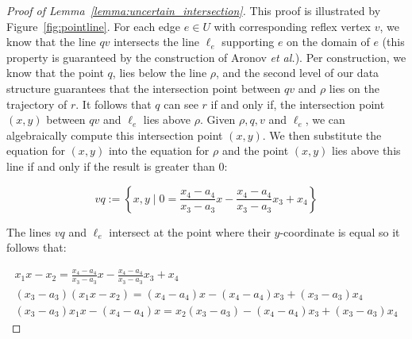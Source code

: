 \documentclass[a4paper, UKenglish]{paper}
\newcommand{\etal}{\textit{et al.}\xspace}
\begin{document}
\begin{proof}[Proof of Lemma~\ref{lemma:uncertain_intersection}]
This proof is illustrated by Figure~\ref{fig:pointline}.
For each edge $e \in U$ with corresponding reflex vertex $v$, we know that the line $qv$ intersects the line $\ell_e$ supporting $e$ on the domain of $e$ (this property is guaranteed by the construction of Aronov \etal). Per construction, we know that the point $q$, lies below the line $\rho$, and the second level of our data structure guarantees that the intersection point between $qv$ and $\rho$ lies on the trajectory of $r$. It follows that $q$ can see $r$ if and only if, the intersection point $(x,y)$ between $qv$ and $\ell_e$ lies above $\rho$. Given $\rho, q, v$ and $\ell_e$, we can algebraically compute this intersection point $(x,y)$. We then substitute the equation for $(x, y)$ into the equation for $\rho$ and the point $(x,y)$ lies above this line if and only if the result is greater than $0$:

\[
vq := \left\{x,y \mid 0 =  \frac{x_4 - a_4}{x_3 - a_3} x - \frac{x_4 - a_4}{x_3 - a_3}x_3 + x_4  \right\}
\]

The lines $vq$ and $\ell_e$ intersect at the point where their $y$-coordinate is equal so it follows that: 


\begin{align*}
    x_1 x - x_2 =  \frac{x_4 - a_4}{x_3 - a_3} x - \frac{x_4 - a_4}{x_3 - a_3}x_3 + x_4 \\
    (x_3 - a_3)(x_1 x - x_2) = (x_4 - a_4) x - (x_4 - a_4)x_3 + (x_3 - a_3) x_4 \\
    (x_3 - a_3)x_1 x - (x_4 - a_4) x = x_2 (x_3 - a_3) - (x_4 - a_4)x_3 + (x_3 - a_3) x_4 
\end{align*}


\end{proof}
\end{document}
